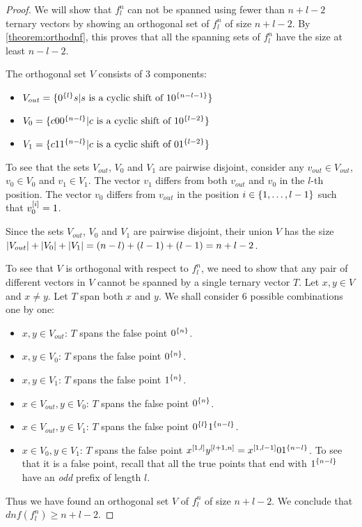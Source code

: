 \begin{proof}
We will show that $f_l^n$ can not be spanned
using fewer than $n+l-2$ ternary vectors
by showing an orthogonal set of $f_l^n$ of size $n+l-2$.
By \cref{theorem:orthodnf},
this proves that all the spanning sets of $f_l^n$
have the size at least $n-l-2$.

The orthogonal set $V$ consists of 3 components:
\begin{itemize}
\item
$V_{out} = \{0^{\{l\}} s
| s \text{ is a cyclic shift of } 1 0^{\{n-l-1\}}\}$
\item
$V_0 = \{c 0 0^{\{n-l\}}
| c \text{ is a cyclic shift of } 1 0^{\{l-2\}}\}$
\item
$V_1 = \{c 1 1^{\{n-l\}}
| c \text{ is a cyclic shift of } 0 1^{\{l-2\}}\}$
\end{itemize}

To see that the sets $V_{out}$, $V_0$ and $V_1$
are pairwise disjoint,
consider any $v_{out} \in V_{out}$,
$v_0 \in V_0$ and $v_1 \in V_1$.
The vector $v_1$ differs from both $v_{out}$ and $v_0$
in the $l$-th position.
The vector $v_0$ differs from $v_{out}$
in the position $i \in \{1, \ldots, l-1\}$
such that $v_0^{[i]} = 1$.

Since the sets $V_{out}$, $V_0$ and $V_1$
are pairwise disjoint,
their union $V$
has the size
$\lvert V_{out}\rvert + \lvert V_0\rvert + \lvert V_1\rvert
= (n-l) + (l-1) + (l-1) = n+l-2$.

To see that $V$ is orthogonal with respect to $f^n_l$,
we need to show that any pair of different vectors in $V$
cannot be spanned by a single ternary vector $T$.
Let $x,y \in V$ and $x \neq y$.
Let $T$ span both $x$ and $y$.
We shall consider 6 possible combinations one by one:
\begin{itemize}
\item $x,y \in V_{out}$:
$T$ spans the false point $0^{\{n\}}$.
\item $x,y \in V_0$:
$T$ spans the false point $0^{\{n\}}$.
\item $x,y \in V_1$:
$T$ spans the false point $1^{\{n\}}$.
\item $x \in V_{out}, y \in V_0$:
$T$ spans the false point $0^{\{n\}}$.
\item $x \in V_{out}, y \in V_1$:
$T$ spans the false point $0^{\{l\}} 1^{\{n-l\}}$.
\item $x \in V_0, y \in V_1$:
$T$ spans the false point
$x^{[1, l]} y^{[l+1, n]}
= x^{[1, l-1]} 0 1^{\{n-l\}}$.
To see that it is a false point,
recall that
all the true points that end with $1^{\{n-l\}}$
have an \emph{odd} prefix of length $l$.
\end{itemize}

Thus we have found an orthogonal set $V$ of $f_l^n$
of size $n+l-2$.
We conclude that $dnf(f_l^n) \geq n+l-2$.
\end{proof}

